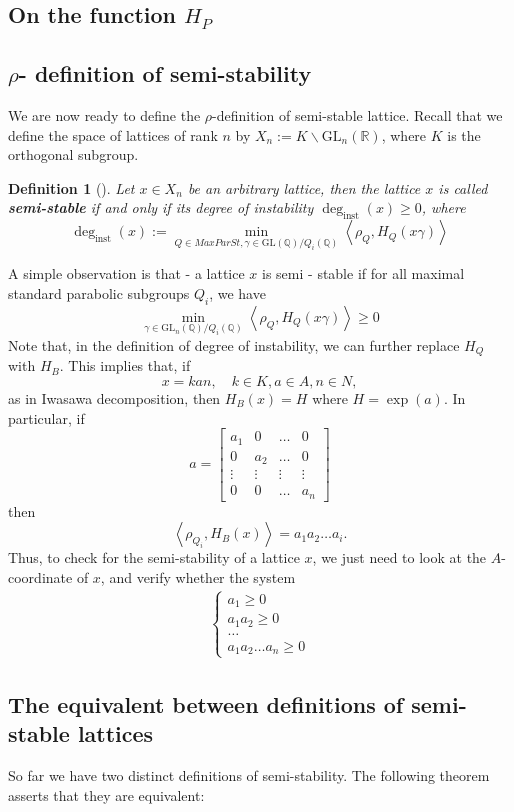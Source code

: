 \documentclass[12pt]{article} %
\newtheorem{definition}{Definition}[section]
\newcommand{\tpoint}[1]{\subsection{#1}}
\begin{document}
\tpoint{On the function $H_P$}
\tpoint{$\rho$- definition of semi-stability}
We are now ready to define the $\rho$-definition of semi-stable lattice. Recall that
we define the space of lattices of rank $n$ by $X_n := K \backslash \text{GL}_n(\mathbb{R})$, where $K$ is the orthogonal subgroup.
\begin{definition}[\label  = $\rho$-definition]\label{ss2}
    Let $x \in X_n$ be an arbitrary lattice, then the lattice $x$ is called \textbf{semi-stable} if and only if its degree of instability $\deg_{\text{inst}}(x)\ge 0$, where
    \[\deg_{\text{inst}}(x):= \min_{Q \in MaxParSt, \gamma \in \text{GL}(\mathbb{Q})/Q_i(\mathbb{Q})}\left\langle \rho_Q, H_Q(x\gamma) \right\rangle\]
\end{definition}
A simple observation is that - a lattice $x$ is semi - stable if for all maximal standard parabolic subgroups
$Q_i$, we have
\[\min_{\gamma \in \text{GL}_n(\mathbb{Q})/Q_i(\mathbb{Q})}\left\langle \rho_Q, H_Q(x\gamma) \right\rangle \ge 0\]
Note that, in the definition of degree of instability, we can further replace $H_Q$ with $H_B$. This implies that, if
\[ x = kan, \quad k \in K, a \in A, n \in N,\]
as in Iwasawa decomposition, then $H_B(x) = H$ where $H = \exp(a)$. In particular, if
\[a = \begin{bmatrix}
        a_1    & 0      & \ldots & 0      \\
        0      & a_2    & \ldots & 0      \\
        \vdots & \vdots & \vdots & \vdots \\
        0      & 0      & \ldots & a_n
    \end{bmatrix}\]
then 
\[\left\langle \rho_{Q_i}, H_B(x) \right\rangle = a_1a_2\ldots a_i.\]
Thus, to check for the semi-stability of a lattice $x$, we just need to look at the
$A$-coordinate of $x$, and verify whether the system
\begin{align*}
    \begin{cases}
        a_1 \ge 0   \\
        a_1a_2\ge 0 \\
        \ldots      \\
        a_1a_2\ldots a_n \ge 0
    \end{cases}
\end{align*}
\tpoint{The equivalent between definitions of semi-stable lattices}
So far we have two distinct definitions of semi-stability. The following theorem asserts that they are equivalent:
\end{document}
